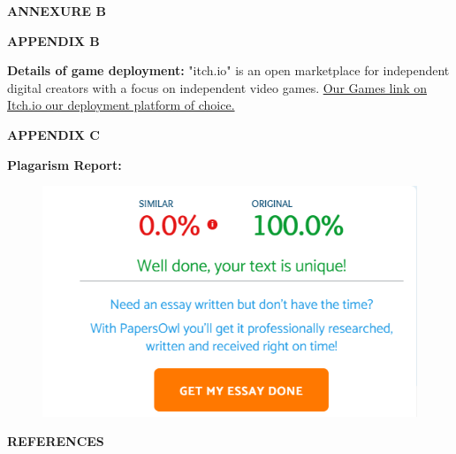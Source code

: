 \documentclass[12pt]{report}
\begin{document}
\newpage
\centering
\Large\textbf{ANNEXURE B}

\centering

\Large\textbf{APPENDIX B}\\
\justifying
\setlength{\parindent}{4em}
\setlength{\parskip}{0.5em}
\renewcommand{\baselinestretch}{1.5}
\normalsize
\raggedright\textbf{Details of game deployment:} "itch.io" is an open marketplace for independent digital creators with a focus on independent video games.
\href{https://sharanthakur.itch.io/infinite-pleasure-dodgeball}{Our Games link on Itch.io our deployment platform of choice.}

\vspace{1cm}


\vspace{0.1cm} 






\vspace{15 cm}

\clearpage

\centering

\Large\textbf{APPENDIX C}\\
\justifying
\setlength{\parindent}{4em}
\setlength{\parskip}{0.5em}
\renewcommand{\baselinestretch}{1.5}
\large
\raggedright\textbf{Plagarism Report:}
\vspace{1cm}

\begin{figure}[h]
\centering
\includegraphics[scale=0.9]{image32.png}

\end{figure}
\vspace{15 cm}


\centering
\Large\textbf{REFERENCES}
\justifying
\setlength{\parindent}{4em}
\setlength{\parskip}{0.5em}
\renewcommand{\baselinestretch}{1.5}
\normalsize
\end{document}
